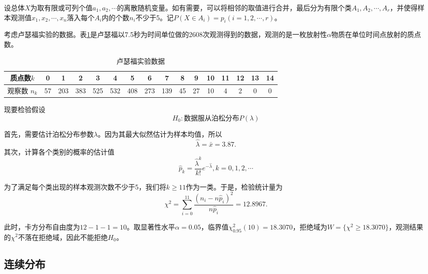 设总体$X$为取有限或可列个值$a_1,a_2,\cdots$的离散随机变量。如有需要，可以将相邻的取值进行合并，最后分为有限个类$A_1,A_2,\cdots,A_r$，并使得样本观测值$x_1,x_2,\cdots,x_n$落入每个$A_i$内的个数$n_i$不少于5。记$P(X\in A_i) = p_i (i=1,2,\cdots,r)$。

\begin{example}
    考虑卢瑟福实验的数据。表\ref{tab:chap23_discrete_distribution_chi2_test}是卢瑟福以7.5秒为时间单位做的2608次观测得到的数据，观测的是一枚放射性$\alpha$物质在单位时间点放射的质点数。
    \begin{table}[ht]
        \centering
        \caption{卢瑟福实验数据}\label{tab:chap23_discrete_distribution_chi2_test}
        \begin{tabular}{c ccccc ccccc ccccc}
            \hline
            质点数$k$ & 0 & 1 & 2 & 3 & 4 & 5 & 6 & 7 & 8 & 9 & 10 & 11 & 12 & 13 & 14  \\
            \hline
            观察数 $n_k$ & 57 & 203 & 383 & 525 & 532 & 408 & 273 & 139 & 45 & 27 & 10 & 4 & 2 & 0 & 0\\  
             \hline
        \end{tabular}
    \end{table}

    现要检验假设
    $$
    H_0: \text{数据服从泊松分布}P(\lambda)
    $$
\end{example}
\begin{solution}
    首先，需要估计泊松分布参数$\lambda$。因为其最大似然估计为样本均值，所以
    $$
    \hat{\lambda} = \bar{x} = 3.87.
    $$
    其次，计算各个类别的概率的估计值
    $$
    \hat{p}_k = \frac{\hat{\lambda}^k}{k!} e^{-\hat{\lambda}},k=0,1,2,\cdots
    $$

    为了满足每个类出现的样本观测次数不少于5，我们将$k\geq 11$作为一类。于是，检验统计量为
    $$
    \chi^2 = \sum_{i=0}^{11} \frac{(n_{i} - n \hat{p}_{i})^2}{n \hat{p}_i} = 12.8967.
    $$

    此时，卡方分布自由度为$12-1-1 =10$。取显著性水平$\alpha = 0.05$，临界值$\chi^2_{0.95}(10) = 18.3070$，拒绝域为$W = \{ \chi^2 \geq 18.3070\}$，观测结果的$\chi^2$不落在拒绝域，因此不能拒绝$H_0$。
\end{solution}
\subsection{连续分布}

